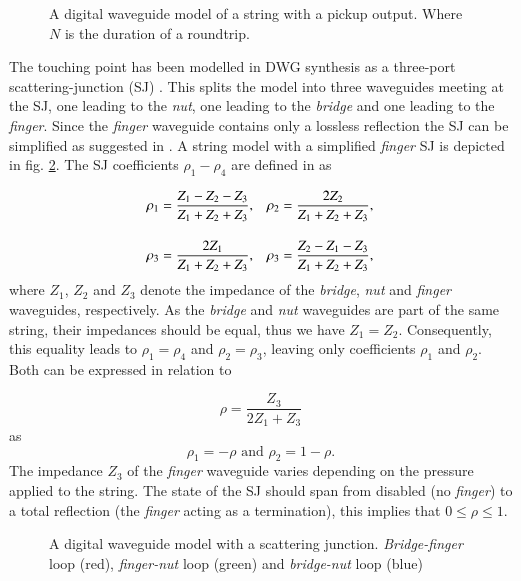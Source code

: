 \documentclass{sigchi}
\begin{document}
\begin{figure}[h]
	\centering
	\scalebox{0.75}{}
	\caption{
		A digital waveguide model of a string with a pickup output.
		Where $N$ is the duration of a roundtrip.
	}
	\label{fig:pickup}
\end{figure}

The touching point has been modelled in DWG synthesis as a three-port scattering-junction (SJ) \cite{scavone_digital_1997, valimaki_modeling_1993}.
This splits the model into three waveguides meeting at the SJ, one leading to the \textit{nut}, one leading to the \textit{bridge} and one leading to the \textit{finger}.
Since the \textit{finger} waveguide contains only a lossless reflection the SJ can be simplified as suggested in \cite{pakarinen_physical_2005}.
A string model with a simplified \textit{finger} SJ is depicted in fig. \ref{fig:waveguide_sj}.
The SJ coefficients $\rho_1 - \rho_4$ are defined in \cite{pakarinen_physical_2005} as

\begin{align} \label{eq:rhoCoeff}
	\rho_1 & = \frac{Z_1-Z_2-Z_3}{Z_1+Z_2+Z_3},       &
	\rho_2 & = \frac{2Z_2}{Z_1+Z_2+Z_3},\notag   \\[1em]
	\rho_3 & = \frac{2Z_1}{Z_1+Z_2+Z_3},       &
	\rho_3 & = \frac{Z_2-Z_1-Z_3}{Z_1+Z_2+Z_3},
\end{align}
where $Z_1$, $Z_2$ and $Z_3$ denote the impedance of the \textit{bridge}, \textit{nut} and \textit{finger} waveguides, respectively.
As the \textit{bridge} and \textit{nut} waveguides are part of the same string, their impedances should be equal, thus we have $Z_1=Z_2$.
Consequently, this equality leads to $\rho_1=\rho_4$ and $\rho_2=\rho_3$, leaving only coefficients $\rho_1$ and $\rho_2$.
Both can be expressed in relation to

\begin{equation} \label{eq:rho}
	\rho=\frac{Z_3}{2Z_1+Z_3}
\end{equation}
as
\begin{equation}
	\rho_1=-\rho \text{ and } \rho_2=1-\rho.
\end{equation}
The impedance $Z_3$ of the \textit{finger} waveguide varies depending on the pressure applied to the string.
The state of the SJ should span from disabled (no \textit{finger}) to a total reflection (the \textit{finger} acting as a termination), this implies that $0 \leq \rho \leq 1$.

\begin{figure}[h]
	\centering
	\scalebox{0.56}{}
	\caption{A digital waveguide model with a scattering junction.
	\textit{Bridge-finger} loop (red), \textit{finger-nut} loop (green) and \textit{bridge-nut} loop (blue)}
	\label{fig:waveguide_sj}
\end{figure}
\end{document}
